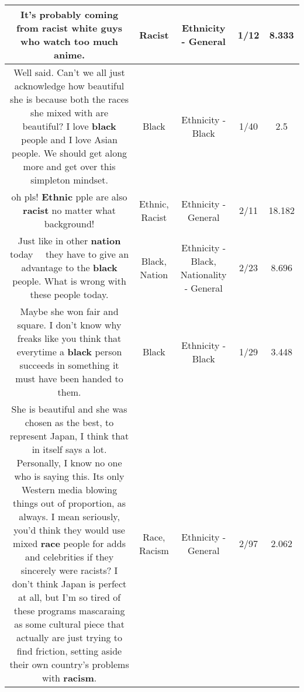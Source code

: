 \documentclass[11pt]{article}
\newlength\mylength
\begin{document}
\begin{center}
\begin{longtable}{|C{.65\mylength}|C{.30\mylength}|C{.12\mylength}|C{.12\mylength}|C{.12\mylength}|}
  \small It's probably coming from \textbf{racist} white guys who watch too much anime.\normalsize   & Racist & Ethnicity - General & 1/12 & 8.333 \\  \hline
  \small Well said. Can't we all just acknowledge how beautiful she is because both the races she mixed with are beautiful? I love \textbf{black} people and I love Asian people. We should get along more and get over this simpleton mindset.\normalsize   & Black & Ethnicity - Black & 1/40 & 2.5 \\  \hline
  \small oh pls! \textbf{Ethnic} pple are also \textbf{racist} no matter what background!\normalsize   & Ethnic, Racist & Ethnicity - General & 2/11 & 18.182 \\  \hline
  \small Just like in other \textbf{nation} today   they have to give an advantage to the \textbf{black} people. What is wrong with these people today.\normalsize   & Black, Nation & Ethnicity - Black, Nationality - General & 2/23 & 8.696 \\  \hline
  \small Maybe she won fair and square. I don't know why freaks like you think that everytime a \textbf{black} person succeeds in something it must have been handed to them.\normalsize   & Black & Ethnicity - Black & 1/29 & 3.448 \\  \hline
  \small She is beautiful and she was chosen as the best, to represent Japan, I think that in itself says a lot. Personally, I know no one who is saying this. Its only Western media blowing things out of proportion, as always. I mean seriously, you'd think they would use mixed \textbf{race} people for adds and celebrities if they sincerely were racists? I don't think Japan is perfect at all, but I'm so tired of these programs mascaraing as some cultural piece that actually are just trying to find friction, setting aside their own country's problems with \textbf{racism}.\normalsize   & Race, Racism & Ethnicity - General & 2/97 & 2.062 \\  \hline

\end{longtable}
\end{center}
\end{document}
